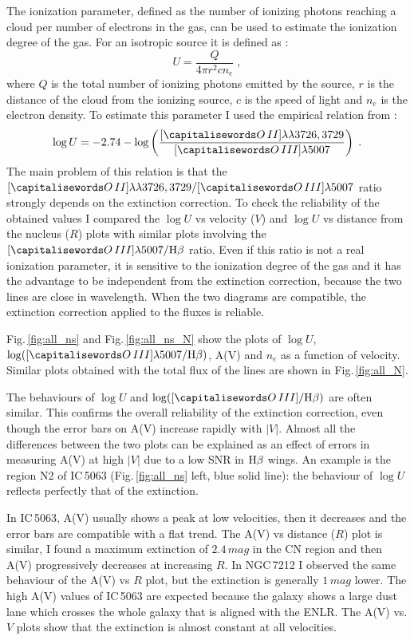 \documentclass[../main.tex]{subfiles}
\begin{document}
The ionization parameter, defined as the number of ionizing photons reaching a cloud per number of electrons in the gas, can be used to estimate the ionization degree of the gas.
For an isotropic source it is defined as :
\begin{equation}
U=\frac{Q}{4\pi r^2 c n_e}\;,
\end{equation}
where $Q$ is the total number of ionizing photons emitted by the source, $r$ is the distance of the cloud from the ionizing source, $c$ is the speed of light and $n_e$ is the electron density.
To estimate this parameter I used the empirical relation from \citet{Penston90}:
\begin{equation}
\label{eq:U}
\log U= -2.74 - \log\left(\frac{[\ion{O}{II}]\lambda\lambda3726,3729}{[\ion{O}{III}]\lambda5007}\right)\;.
\end{equation}
The main problem of this relation is that the $[\ion{O}{II}]\lambda\lambda3726,3729/ [\ion{O}{III}]\lambda5007$ ratio strongly depends on the extinction correction.
To check the reliability of the obtained values I compared the $\log U$ vs velocity ($V$) and $\log U$ vs distance from the nucleus ($R$) plots with similar plots involving the $[\ion{O}{III}]\lambda5007/\Hb$ ratio.
Even if this ratio is not a real ionization parameter, it is sensitive to the ionization degree of the gas and it has the advantage to be independent from the extinction correction, because the two lines are close in wavelength.
When the two diagrams are compatible, the extinction correction applied to the fluxes is reliable.

Fig.\,\ref{fig:all_ns} and Fig.\,\ref{fig:all_ns_N} show the plots of  $\log U$, $\log([\ion{O}{III}]\lambda5007/\Hb)$, A(V) and $n_e$ as a function of velocity.
Similar plots obtained with the total flux of the lines are shown in Fig.\,\ref{fig:all_N}.

The behaviours of $\log U$ and $\log([\ion{O}{III}]/\Hb)$ are often similar.
This confirms the overall reliability of the extinction correction, even though the error bars on A(V) increase rapidly with $\lvert V \rvert$.
Almost all the differences between the two plots can be explained as an effect of errors in measuring A(V) at high $\lvert V \rvert$ due to a low SNR in $\rm H\beta$ wings.
An example is the region N2 of IC\,5063 (Fig.\,\ref{fig:all_ns} left, blue solid line):  the behaviour of $\log U$ reflects perfectly that of the extinction.

In IC\,5063, A(V) usually shows a peak at low velocities, then it decreases and the error bars are compatible with a flat trend.
The A(V) vs distance ($R$) plot is similar, I found a maximum extinction of $2.4\,\si{mag}$ in the CN region and then A(V) progressively decreases at increasing $R$.
In NGC\,7212 I observed the same behaviour of the A(V) vs $R$ plot, but the extinction is generally $1\,\si{mag}$ lower.
The high A(V) values of IC\,5063 are expected because the galaxy shows a large dust lane which crosses the whole galaxy that is aligned with the ENLR.
The A(V) vs. $V$ plots show that the extinction is almost constant at all velocities.
\end{document}
